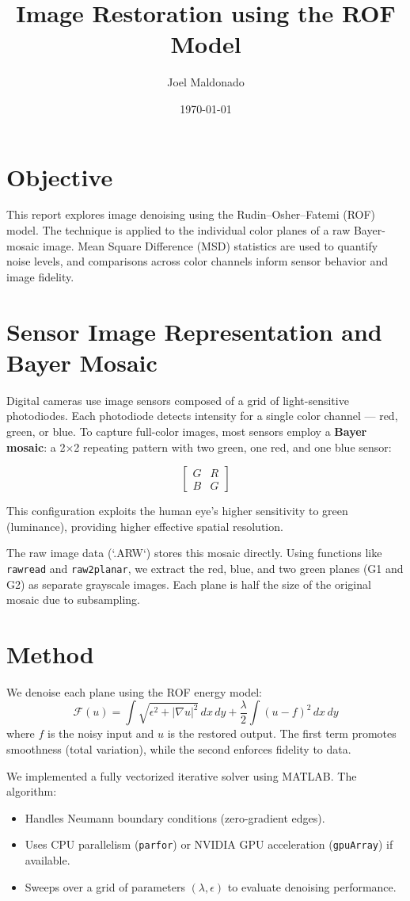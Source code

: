 \documentclass[11pt]{article}
\title{Image Restoration using the ROF Model}
\author{Joel Maldonado}
\date{\today}
\begin{document}
\maketitle

\section*{Objective}
This report explores image denoising using the Rudin–Osher–Fatemi (ROF) model. The technique is applied to the individual color planes of a raw Bayer-mosaic image. Mean Square Difference (MSD) statistics are used to quantify noise levels, and comparisons across color channels inform sensor behavior and image fidelity.

\section*{Sensor Image Representation and Bayer Mosaic}
Digital cameras use image sensors composed of a grid of light-sensitive photodiodes. Each photodiode detects intensity for a single color channel — red, green, or blue. To capture full-color images, most sensors employ a \textbf{Bayer mosaic}: a 2×2 repeating pattern with two green, one red, and one blue sensor:

\[
\begin{bmatrix}
G & R \\
B & G
\end{bmatrix}
\]

This configuration exploits the human eye's higher sensitivity to green (luminance), providing higher effective spatial resolution.

The raw image data (`.ARW`) stores this mosaic directly. Using functions like \texttt{rawread} and \texttt{raw2planar}, we extract the red, blue, and two green planes (G1 and G2) as separate grayscale images. Each plane is half the size of the original mosaic due to subsampling.

\section*{Method}
We denoise each plane using the ROF energy model:
\[
\mathcal{F}(u) = \int \sqrt{\epsilon^2 + |\nabla u|^2} \, dx\,dy + \frac{\lambda}{2} \int (u - f)^2 \, dx\,dy
\]
where \( f \) is the noisy input and \( u \) is the restored output. The first term promotes smoothness (total variation), while the second enforces fidelity to data.

We implemented a fully vectorized iterative solver using MATLAB. The algorithm:
\begin{itemize}
  \item Handles Neumann boundary conditions (zero-gradient edges).
  \item Uses CPU parallelism (\texttt{parfor}) or NVIDIA GPU acceleration (\texttt{gpuArray}) if available.
  \item Sweeps over a grid of parameters \((\lambda, \epsilon)\) to evaluate denoising performance.
\end{itemize}
\end{document}
